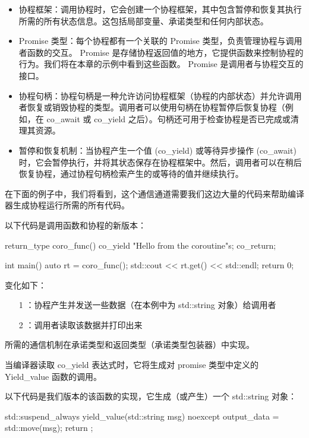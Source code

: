 \begin{itemize}
\item
协程框架：调用协程时，它会创建一个协程框架，其中包含暂停和恢复其执行所需的所有状态信息。这包括局部变量、承诺类型和任何内部状态。

\item
Promise 类型：每个协程都有一个关联的 Promise 类型，负责管理协程与调用者函数的交互。 Promise 是存储协程返回值的地方，它提供函数来控制协程的行为。我们将在本章的示例中看到这些函数。 Promise 是调用者与协程交互的接口。

\item
协程句柄：协程句柄是一种允许访问协程框架（协程的内部状态）并允许调用者恢复或销毁协程的类型。调用者可以使用句柄在协程暂停后恢复协程（例如，在 co\_await 或 co\_yield 之后）。句柄还可用于检查协程是否已完成或清理其资源。

\item
暂停和恢复机制：当协程产生一个值 (co\_yield) 或等待异步操作 (co\_await) 时，它会暂停执行，并将其状态保存在协程框架中。然后，调用者可以在稍后恢复协程，通过协程句柄检索产生的或等待的值并继续执行。
\end{itemize}

在下面的例子中，我们将看到，这个通信通道需要我们这边大量的代码来帮助编译器生成协程运行所需的所有代码。

以下代码是调用函数和协程的新版本：

\begin{cpp}
return_type coro_func() {
    co_yield "Hello from the coroutine\n"s;
    co_return;
}

int main() {
    auto rt = coro_func();
    std::cout << rt.get() << std::endl;
    return 0;
}
\end{cpp}

变化如下：

\begin{itemize}
\item
[1]：协程产生并发送一些数据（在本例中为 std::string 对象）给调用者

\item
[2]：调用者读取该数据并打印出来
\end{itemize}

所需的通信机制在承诺类型和返回类型（承诺类型包装器）中实现。

当编译器读取 co\_yield 表达式时，它将生成对 promise 类型中定义的 Yield\_value 函数的调用。

以下代码是我们版本的该函数的实现，它生成（或产生）一个 std::string 对象：

\begin{cpp}
std::suspend_always yield_value(std::string msg) noexcept {
    output_data = std::move(msg);
    return {};
}
\end{cpp}

